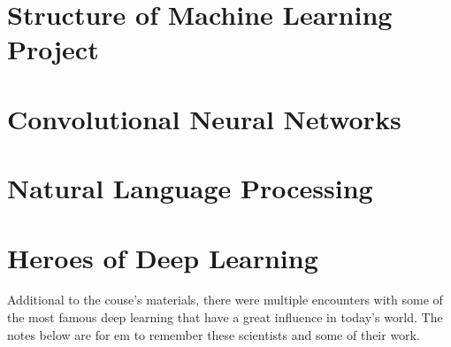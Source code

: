 \documentclass[11pt]{report}
\begin{document}
\chapter{Structure of Machine Learning Project}

\chapter{Convolutional Neural Networks}

\chapter{Natural Language Processing}

\chapter{Heroes of Deep Learning}
Additional to the couse's materials, there were multiple encounters with some of the most famous deep learning  that have a great influence in today's world. The notes below are for em to remember these scientists and some of their work.
\end{document}
